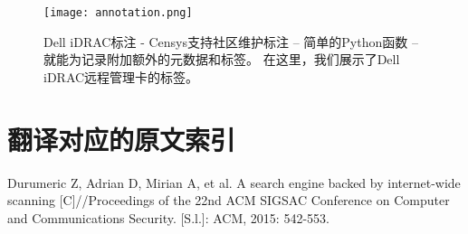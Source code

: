\begin{figure}[H]
  \centering
  \texttt{[image: annotation.png]}
  \caption{{\heiti Dell iDRAC标注} - Censys支持社区维护标注 – 简单的Python函数 – 就能为记录附加额外的元数据和标签。
  在这里，我们展示了Dell iDRAC远程管理卡的标签。}
  \label{fig:annotation}
\end{figure}

\section*{翻译对应的原文索引}

\begin{translationbib}
\item Durumeric Z, Adrian D, Mirian A, et al. A search engine backed by internet-wide scanning
[C]//Proceedings of the 22nd ACM SIGSAC Conference on Computer and Communications
Security. [S.l.]: ACM, 2015: 542-553.
\end{translationbib}